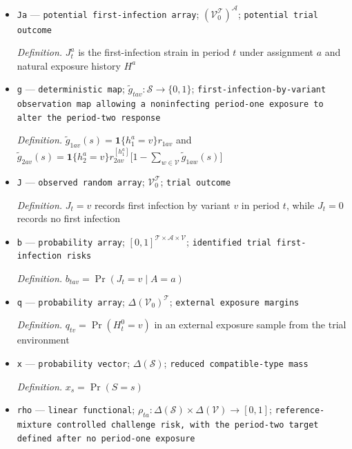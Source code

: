 \documentclass{article}
\begin{document}
\begin{itemize}
  \par\smallskip\noindent\emph{Definition.} \(S=(H^0,H^1,R_1,R_2^{[\cdot]})\)
  \item \texttt{Ja} --- \texttt{potential first-\allowbreak{}infection array}; \((\mathcal V_0^{\mathcal T})^{\mathcal A}\); \texttt{potential trial outcome}
  \par\smallskip\noindent\emph{Definition.} \(J^a_t\) is the first-infection strain in period \(t\) under assignment \(a\) and natural exposure history \(H^a\)
  \item \texttt{g} --- \texttt{deterministic map}; \(\widetilde g_{tav}:\mathcal S\to\{0,1\}\); \texttt{first-\allowbreak{}infection-\allowbreak{}by-\allowbreak{}variant observation map allowing a noninfecting period-\allowbreak{}one exposure to alter the period-\allowbreak{}two response}
  \par\smallskip\noindent\emph{Definition.} \(\widetilde g_{1av}(s)=\mathbf 1\{h_1^a=v\}r_{1av}\) and \(\widetilde g_{2av}(s)=\mathbf 1\{h_2^a=v\}r^{[h_1^a]}_{2av}\bigl[1-\sum_{w\in\mathcal V}\widetilde g_{1aw}(s)\bigr]\)
  \item \texttt{J} --- \texttt{observed random array}; \(\mathcal V_0^{\mathcal T}\); \texttt{trial outcome}
  \par\smallskip\noindent\emph{Definition.} \(J_t=v\) records first infection by variant \(v\) in period \(t\), while \(J_t=0\) records no first infection
  \item \texttt{b} --- \texttt{probability array}; \([0,1]^{\mathcal T\times\mathcal A\times\mathcal V}\); \texttt{identified trial first-\allowbreak{}infection risks}
  \par\smallskip\noindent\emph{Definition.} \(b_{tav}=\Pr(J_t=v\mid A=a)\)
  \item \texttt{q} --- \texttt{probability array}; \(\Delta(\mathcal V_0)^{\mathcal T}\); \texttt{external exposure margins}
  \par\smallskip\noindent\emph{Definition.} \(q_{tv}=\Pr(H_t^0=v)\) in an external exposure sample from the trial environment
  \item \texttt{x} --- \texttt{probability vector}; \(\Delta(\mathcal S)\); \texttt{reduced compatible-\allowbreak{}type mass}
  \par\smallskip\noindent\emph{Definition.} \(x_s=\Pr(S=s)\)
  \item \texttt{rho} --- \texttt{linear functional}; \(\rho_{ta}:\Delta(\mathcal S)\times\Delta(\mathcal V)\to[0,1]\); \texttt{reference-\allowbreak{}mixture controlled challenge risk,\allowbreak{} with the period-\allowbreak{}two target defined after no period-\allowbreak{}one exposure}

\end{itemize}
\end{document}
